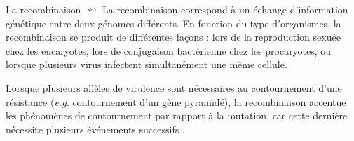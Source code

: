 \hypertarget{recomb1}{}
\begin{encadre2}{La recombinaison}
  \hyperlink{recomb2}{$\curvearrowleft$}
     La recombinaison correspond à un échange d’information génétique entre deux
génomes différents. En fonction du type d'organismes, la
recombinaison se produit de différentes façons :  lors de la reproduction sexuée chez
les eucaryotes, lors de conjugaison bactérienne chez les procaryotes, ou lorsque
plusieurs  virus infectent simultanément une même cellule.
\par
Lorsque  plusieurs allèles de virulence sont nécessaires au contournement d’une résistance (\textit{e.g.} contournement d'un gène pyramidé), la recombinaison accentue les phénomènes de contournement par rapport  à la mutation, car cette dernière nécessite plusieurs événements successifs \citep{McDonald2002}.
\end{encadre2}


